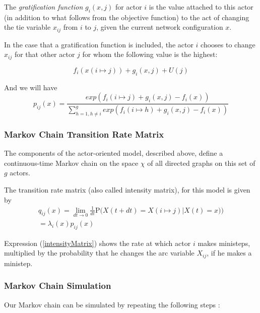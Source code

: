\documentclass[11pt]{report}
\begin{document}
The \textit{gratification function} $g_i(x,j)$ for actor $i$ is the value attached to this actor (in addition to what follows from the objective function) to the act of changing the tie variable $x_{ij}$ from $i$ to $j$, given the current network configuration $x$. 

In the case that a gratification function is included, the actor $i$ chooses to change $x_{ij}$ for that other actor $j$ for whom the following value \cite{Snijders2004} is the highest:

\begin{equation}
f_i(x(i \mapsto j)) + g_i(x, j) + U(j)
\end{equation} 

And we will have 
\begin{equation}
\label{ObjectiveFunctionWithGratification}
p_{ij}(x) = \frac{exp(f_i(i \mapsto j) + g_i(x, j) - f_i(x))}{\sum_{h=1, h \neq i}^{g} exp(f_i(i \mapsto h) + g_i(x, j) - f_i(x))}
\end{equation}

\subsubsection{Markov Chain Transition Rate Matrix}
The components of the actor-oriented model, described above, define a continuous-time Markov chain on the space $\chi$ of all directed graphs on this set of $g$ actors. 

The transition rate matrix (also called intensity matrix), for this model is given by
\begin{multline}
\label{intensityMatrix}
q_{ij}(x) = \lim_{dt \to 0} \frac{1}{dt} \mathrm {P} \big({X(t + dt) = X(i \mapsto j) | X(t) = x)}\big) \\ = \lambda_i(x) p_{ij}(x)
\end{multline}

Expression (\ref{intensityMatrix}) shows the rate at which actor $i$ makes ministeps, multiplied by the probability that he changes the arc variable $X_{ij}$, if he makes a ministep.\\

\subsubsection{Markov Chain Simulation}
\label{MarkovChainSimulationSteps}
Our Markov chain can be simulated by repeating the following steps \cite{Snijders2004}:
\end{document}
